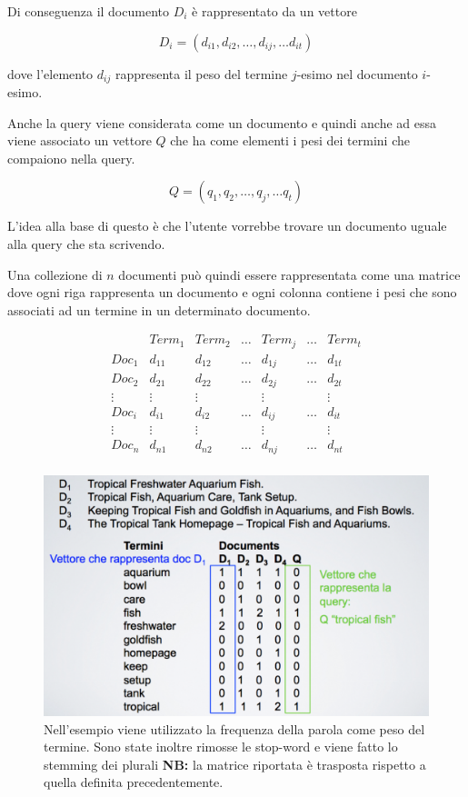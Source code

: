 Di conseguenza il documento $D_i$ è rappresentato da un vettore

$$
D_i = (d_{i1},d_{i2},\ldots,d_{ij}, \ldots d_{it})
$$

\noindent dove l'elemento $d_{ij}$ rappresenta il peso del termine $j$-esimo nel documento $i$-esimo.

Anche la query viene considerata come un documento e quindi anche ad essa viene associato un vettore $Q$ che ha come elementi i pesi dei termini che compaiono nella query.

$$
Q = (q_{1},q_{2},\ldots,q_{j}, \ldots q_{t})
$$

L'idea alla base di questo è che l'utente vorrebbe trovare un documento uguale alla query che sta scrivendo.

Una collezione di $n$ documenti può quindi essere rappresentata come una matrice dove ogni riga rappresenta un documento e ogni colonna contiene i pesi che sono associati ad un termine in un determinato documento.

$$
\begin{matrix}
& Term_1 & Term_2 & \ldots & Term_j & \ldots &Term_t \\ 
Doc_1 & d_{11} & d_{12}& \ldots & d_{1j} & \ldots & d_{1t} \\ 
Doc_2 & d_{21} & d_{22}& \ldots & d_{2j} & \ldots & d_{2t} \\ 
\vdots & \vdots &\vdots  &  & \vdots && \vdots\\ 
Doc_i & d_{i1} & d_{i2}& \ldots & d_{ij} & \ldots & d_{it} \\ 
\vdots & \vdots &\vdots  &  & \vdots && \vdots\\ 
Doc_n & d_{n1} & d_{n2}& \ldots & d_{nj} & \ldots & d_{nt} \\ 
\end{matrix}
$$

\begin{figure}[htbp]
	\centering
	\includegraphics[width=0.6\linewidth]{images/l8-mod-vet}
	\caption{Nell'esempio viene utilizzato la frequenza della parola come peso del termine. Sono state inoltre rimosse le stop-word e viene fatto lo stemming dei plurali \textbf{NB:} la matrice riportata è trasposta rispetto a quella definita precedentemente.}
\end{figure}

